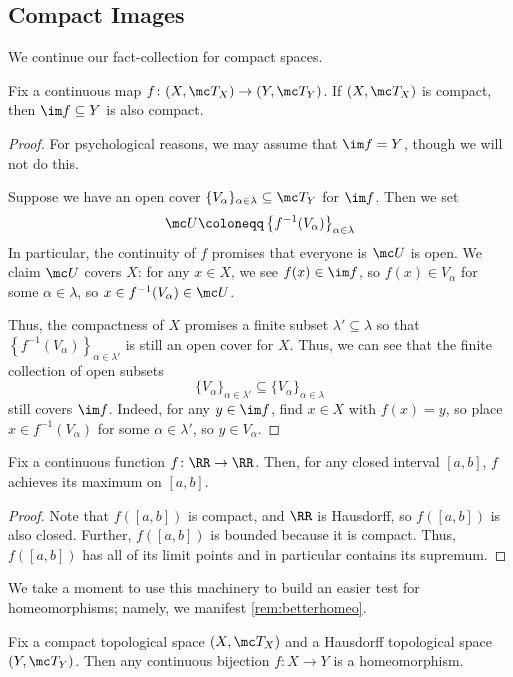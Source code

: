 \documentclass[../notes.tex]{subfiles}
\begin{document}
\subsection{Compact Images}
We continue our fact-collection for compact spaces.
\begin{lemma} \label{lem:compactimage}
	Fix a continuous map $f\colon(X,\mc T_X)\to(Y,\mc T_Y)$. If $(X,\mc T_X)$ is compact, then $\im f\subseteq Y$ is also compact.
\end{lemma}
\begin{proof}
	For psychological reasons, we may assume that $\im f=Y$, though we will not do this.

	Suppose we have an open cover $\{V_\alpha\}_{\alpha\in\lambda}\subseteq\mc T_Y$ for $\im f$. Then we set
	\[\mc U\coloneqq\left\{f^{-1}(V_\alpha)\right\}_{\alpha\in\lambda}\]
	In particular, the continuity of $f$ promises that everyone is $\mc U$ is open. We claim $\mc U$ covers $X$: for any $x\in X$, we see $f(x)\in\im f$, so $f(x)\in V_\alpha$ for some $\alpha\in\lambda$, so $x\in f^{-1}(V_\alpha)\in\mc U$.

	Thus, the compactness of $X$ promises a finite subset $\lambda'\subseteq\lambda$ so that $\left\{f^{-1}(V_\alpha)\right\}_{\alpha\in\lambda'}$ is still an open cover for $X$. Thus, we can see that the finite collection of open subsets
	\[\{V_\alpha\}_{\alpha\in\lambda'}\subseteq\{V_\alpha\}_{\alpha\in\lambda}\]
	still covers $\im f$. Indeed, for any $y\in\im f$, find $x\in X$ with $f(x)=y$, so place $x\in f^{-1}(V_\alpha)$ for some $\alpha\in\lambda'$, so $y\in V_\alpha$.
\end{proof}
\begin{corollary}
	Fix a continuous function $f\colon\RR\to\RR$. Then, for any closed interval $[a,b]$, $f$ achieves its maximum on $[a,b]$.
\end{corollary}
\begin{proof}
	Note that $f([a,b])$ is compact, and $\RR$ is Hausdorff, so $f([a,b])$ is also closed. Further, $f([a,b])$ is bounded because it is compact. Thus, $f([a,b])$ has all of its limit points and in particular contains its supremum.
\end{proof}
We take a moment to use this machinery to build an easier test for homeomorphisms; namely, we manifest \autoref{rem:betterhomeo}.
\begin{proposition}
	Fix a compact topological space $(X,\mc T_X)$ and a Hausdorff topological space $(Y,\mc T_Y)$. Then any continuous bijection $f\colon X\to Y$ is a homeomorphism.
\end{proposition}
\end{document}
